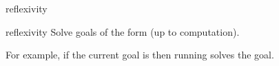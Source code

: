 \begin{tactic}{reflexivity}
  \begin{tsyntax}[empty]{reflexivity}
  Solve goals of the form  (up to computation).

  For example, if the current goal is
   then
  running 
  solves the goal.
  \end{tsyntax}
\end{tactic}
